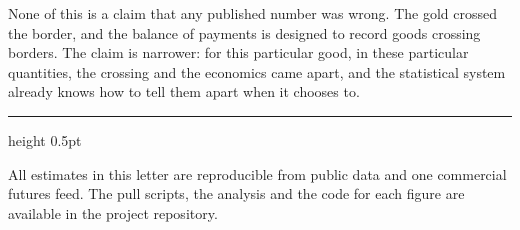 \documentclass[11pt]{article}
\begin{document}
None of this is a claim that any published number was wrong. The gold crossed
the border, and the balance of payments is designed to record goods crossing
borders. The claim is narrower: for this particular good, in these particular
quantities, the crossing and the economics came apart, and the statistical
system already knows how to tell them apart when it chooses to.

\vspace{8pt}
{\color{rule}\hrule height 0.5pt}
\vspace{4pt}

{\sffamily\footnotesize\color{soft}
All estimates in this letter are reproducible from public data and one
commercial futures feed. The pull scripts, the analysis and the code for each
figure are available in the project repository.\par}

\theendnotes
\end{document}

